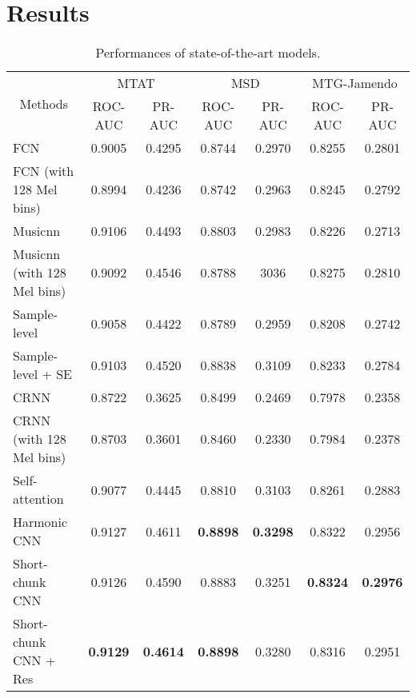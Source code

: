 \documentclass{article}
\begin{document}
\section{Results}\label{sec:results}
\begin{table*}[ht!]
\centering
\small
\begin{tabular}{@{}lcccccc@{}}
\toprule
\multicolumn{1}{c}{\multirow{2}{*}{Methods}} & \multicolumn{2}{c}{MTAT}    & \multicolumn{2}{c}{MSD} & \multicolumn{2}{c}{MTG-Jamendo} \\ \cmidrule(l){2-7} 
\multicolumn{1}{c}{}    & ROC-AUC   & PR-AUC    & ROC-AUC   & PR-AUC    & ROC-AUC   & PR-AUC   \\ \midrule
FCN \cite{choi2016automatic}                    & 0.9005    & 0.4295    & 0.8744    & 0.2970    & 0.8255    & 0.2801    \\
FCN (with 128 Mel bins)                  & 0.8994    & 0.4236    & 0.8742    & 0.2963    & 0.8245    & 0.2792    \\
Musicnn \cite{pons2018end}                      & 0.9106    & 0.4493    & 0.8803    & 0.2983    & 0.8226    & 0.2713    \\
Musicnn (with 128 Mel bins)                      & 0.9092    & 0.4546    & 0.8788    & 3036    & 0.8275    & 0.2810    \\
Sample-level \cite{lee2017sample}               & 0.9058    & 0.4422    & 0.8789    & 0.2959    & 0.8208    & 0.2742    \\
Sample-level + SE \cite{kim2018sample}          & 0.9103    & 0.4520    & 0.8838    & 0.3109    & 0.8233    & 0.2784    \\
CRNN \cite{choi2017convolutional}               & 0.8722    & 0.3625    & 0.8499    & 0.2469    & 0.7978    & 0.2358    \\
CRNN (with 128 Mel bins)              & 0.8703    & 0.3601    & 0.8460    & 0.2330    & 0.7984    & 0.2378    \\
Self-attention \cite{won2019toward}             & 0.9077    & 0.4445    & 0.8810    & 0.3103    & 0.8261    & 0.2883    \\
Harmonic CNN \cite{won2020data}                 & 0.9127    & 0.4611    & \textbf{0.8898}    & \textbf{0.3298}    & 0.8322    & 0.2956         \\
Short-chunk CNN                            & 0.9126    & 0.4590         & 0.8883    & 0.3251    & \textbf{0.8324}    & \textbf{0.2976}         \\
Short-chunk CNN + Res                        & \textbf{0.9129}    & \textbf{0.4614}    & \textbf{0.8898}    & 0.3280    & 0.8316    & 0.2951    
\\ \bottomrule
\end{tabular}
\caption{Performances of state-of-the-art models.}
\label{tab:mainresults}
\end{table*}
\end{document}

